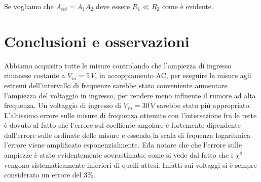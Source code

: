 \documentclass[10pt,a4paper]{article}
\begin{document}
Se vogliamo che $A_{tot} = A_1 A_2$ deve essere $R_1 \ll R_2$ come è evidente.

\section{Conclusioni e osservazioni}
Abbiamo acquisito tutte le misure controlando che l'ampiezza di ingresso rimanese costante a $V_{in} = 5 \, V$, in accoppiamento AC, per eseguire le misure agli estremi dell'intervallo di frequenze sarebbe stato conveniente aumentare l'ampiezza del voltaggio in ingresso, per rendere meno influente il rumore ad alta frequenza. Un voltaggio di ingresso di $V_{in} = 30 \, V$ sarebbe stato più appropriato. L'altissimo errore sulle misure di frequenza ottenute con l'intersezione fra le rette è dovuto al fatto che l'errore sul coeffiente angolare è fortemente dipendente dall'errore sulle ordinate delle misure e essendo la scala di fequenza logaritmica l'errore viene amplificato esponenzialmente. E\' da notare che che l'errore sulle ampiezze è stato evidentemente sovrastimato, come si vede dal fatto che i $\chi^2$ vengono sistematicamente inferiori di quelli attesi. Infatti sui voltaggi si è sempre considerato un errore del $3\%$.
\end{document}
